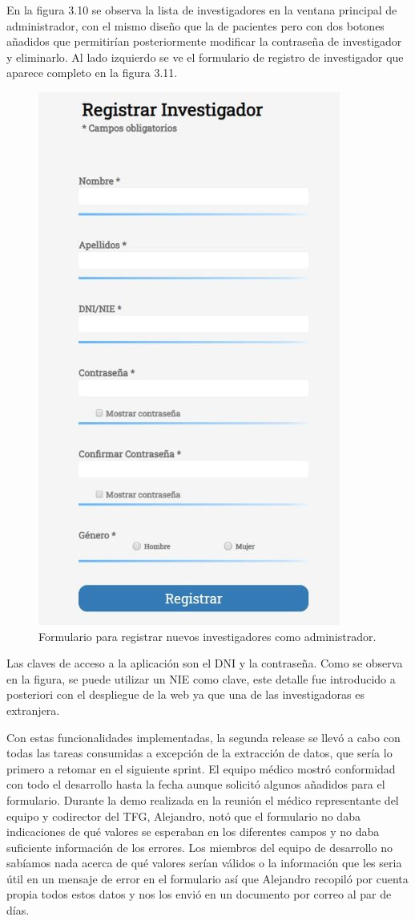 En la figura 3.10 se observa la lista de investigadores en la ventana principal de administrador, con el mismo diseño que la de pacientes pero con dos botones añadidos que permitirían posteriormente modificar la contraseña de investigador y eliminarlo. Al lado izquierdo se ve el formulario de registro de investigador que aparece completo en la figura 3.11.

\begin{figure}[h]
    \centering
     \includegraphics[width=6.cm,height=10.cm]{images/registrarInvestigadores.jpg}
    \caption{Formulario para registrar nuevos investigadores como administrador.}
\end{figure}
\newpage

Las claves de acceso a la aplicación son el DNI y la contraseña. Como se observa en la figura, se puede utilizar un NIE como clave, este detalle fue introducido a posteriori con el despliegue de la web ya que una de las investigadoras es extranjera.
\newline

Con estas funcionalidades implementadas, la segunda release se llevó a cabo con todas las tareas consumidas a excepción de la extracción de datos, que sería lo primero a retomar en el siguiente sprint. El equipo médico mostró conformidad con todo el desarrollo hasta la fecha aunque solicitó algunos añadidos para el formulario. Durante la demo realizada en la reunión el médico representante del equipo y codirector del TFG, Alejandro, notó que el formulario no daba indicaciones de qué valores se esperaban en los diferentes campos y no daba suficiente información de los errores. Los miembros del equipo de desarrollo no sabíamos nada acerca de qué valores serían válidos o la información que les seria útil en un mensaje de error en el formulario así que Alejandro recopiló por cuenta propia todos estos datos y nos los envió en un documento por correo al par de días.

